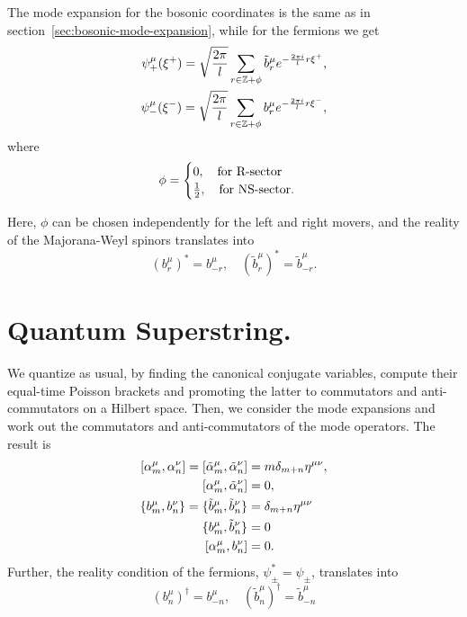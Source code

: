 The mode expansion for the bosonic coordinates is the same as in section~\ref{sec:bosonic-mode-expansion}, while for the fermions we get
\begin{equation}\label{eq:superstring-fermions-mode-expansion}
\begin{aligned}
    \psi^\mu_+ (\xi^+) = \sqrt{\frac{2\pi}{l}} \sum_{r \in \mathbb{Z} + \phi} \tilde{b}^\mu_r e ^{-\frac{2\pi i}{l} r \xi^+} , \\
    \psi^\mu_- (\xi^-) = \sqrt{\frac{2\pi}{l}} \sum_{r \in \mathbb{Z} + \phi} {b}^\mu_r e ^{-\frac{2\pi i}{l} r \xi^-} ,
\end{aligned}
\end{equation}
where
\begin{equation}\label{eq:phi-sectors}
    \phi = \begin{cases}
        0, \quad \textup{for R-sector} \\
        \frac{1}{2}, \quad \textup{for NS-sector} .
    \end{cases}
\end{equation}

Here, $\phi$ can be chosen independently for the left and right movers, and the reality of the Majorana-Weyl spinors translates into
\begin{equation}\label{eq:reality-condition}
    (b^\mu_r)^* = b^\mu_{-r}, \quad (\tilde{b}^\mu_r)^* = \tilde{b}^\mu_{-r}.
\end{equation}

\section{Quantum Superstring.}
We quantize as usual, by finding the canonical conjugate variables, compute their equal-time Poisson brackets and promoting the latter to commutators and anti-commutators on a Hilbert space. Then, we consider the mode expansions and work out the commutators and anti-commutators of the mode operators. The result is
\begin{subequations}
\begin{align}
    \comm{\alpha^\mu_m}{\alpha^\nu_n} = \comm{\tilde{\alpha}^\mu_m}{\tilde{\alpha}^\nu_n} &= m \delta_{m+n} \eta^{\mu\nu} , \\
    \comm{\alpha^\mu_m}{\tilde{\alpha}^\nu_n} &= 0, \\
    \{ b^\mu_m, b^\nu_n \} = \{ \tilde{b}^\mu_m, \tilde{b}^\nu_n \} &= \delta_{m+n} \eta^{\mu\nu} \label{eq:anticomm-bs} \\
    \{ b^\mu_m, \tilde{b}^\nu_n \} &= 0 \\
    \comm{\alpha^\mu_m}{b^\nu_n} &= 0 .
\end{align}
\end{subequations}
Further, the reality condition of the fermions, $\psi^*_\pm = \psi_\pm$, translates into
\begin{equation}
    (b^\mu_n)^\dagger = b^\mu_{-n}, \quad (\tilde{b}^\mu_n)^\dagger = \tilde{b}^\mu_{-n}
\end{equation}

